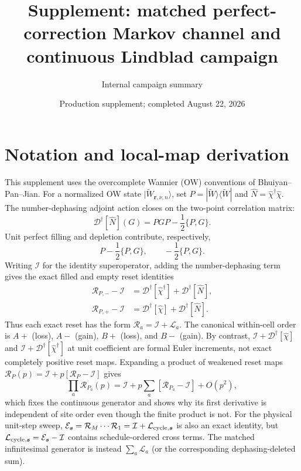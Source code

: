 \documentclass[aps,prb,onecolumn,nofootinbib]{revtex4-2}
\newcommand{\Diss}{\mathcal D}
\begin{document}
\title{Supplement: matched perfect-correction Markov channel and continuous Lindblad campaign}
\author{Internal campaign summary}
\date{Production supplement; completed August 22, 2026}
\maketitle

\section{Notation and local-map derivation}

This supplement uses the overcomplete Wannier (OW) conventions of
Bhuiyan--Pan--Jian.  For a normalized OW state
$|\widetilde W_{\boldsymbol r,\nu,n}\rangle$, set
$P=|\widetilde W\rangle\langle\widetilde W|$ and
$\hat N=\hat\chi^\dagger\hat\chi$.  The number-dephasing adjoint action closes on the
two-point correlation matrix:
\begin{equation}
 \Diss^\dagger[\hat N](G)=PGP-\frac12\{P,G\}.
\end{equation}
Unit perfect filling and depletion contribute, respectively,
\begin{equation}
 P-\frac12\{P,G\},\qquad -\frac12\{P,G\}.
\end{equation}
Writing $\mathcal I$ for the identity superoperator, adding the number-dephasing term
gives the exact filled and empty reset identities
\begin{align}
 \mathcal R_{P,-}-\mathcal I
 &=\Diss^\dagger[\hat\chi^\dagger]+\Diss^\dagger[\hat N],\\
 \mathcal R_{P,+}-\mathcal I
 &=\Diss^\dagger[\hat\chi]+\Diss^\dagger[\hat N].
\end{align}
Thus each exact reset has the form $\mathcal R_a=\mathcal I+\mathcal L_a$.
The canonical within-cell order is $A+$ (loss), $A-$ (gain), $B+$ (loss), and
$B-$ (gain).  By contrast, $\mathcal I+\Diss^\dagger[\hat\chi]$ and
$\mathcal I+\Diss^\dagger[\hat\chi^\dagger]$ at unit coefficient are formal Euler
increments, not exact completely positive reset maps.  Expanding a product of weakened
reset maps $\mathcal R_{P}(p)=\mathcal I+p[\mathcal R_P-\mathcal I]$ gives
\begin{equation}
 \prod_a\mathcal R_{P_a}(p)=\mathcal I
 +p\sum_a[\mathcal R_{P_a}-\mathcal I]+O(p^2),
\end{equation}
which fixes the continuous generator and shows why its first derivative is independent
of site order even though the finite product is not.
For the physical unit-step sweep,
$\mathcal E_{\boldsymbol s}=\mathcal R_M\cdots\mathcal R_1
=\mathcal I+\mathcal L_{{\rm cycle},\boldsymbol s}$ is also an exact identity, but
$\mathcal L_{{\rm cycle},\boldsymbol s}=\mathcal E_{\boldsymbol s}-\mathcal I$
contains schedule-ordered cross terms.  The matched infinitesimal generator is instead
$\sum_a\mathcal L_a$ (or the corresponding dephasing-deleted sum).
\end{document}
